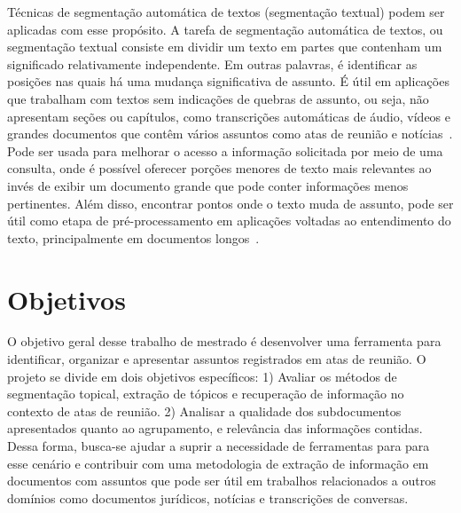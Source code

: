 

Técnicas de segmentação automática de textos (segmentação textual) podem ser aplicadas com esse propósito. A tarefa de segmentação automática de textos, ou segmentação textual consiste em dividir um texto em partes que contenham um significado relativamente independente. Em outras palavras, é identificar as posições nas quais há uma mudança significativa de assunto. É útil em aplicações que trabalham com textos sem indicações de quebras de assunto, ou seja, não apresentam seções ou capítulos, como transcrições automáticas de áudio, vídeos e grandes documentos que contêm vários assuntos como atas de reunião e notícias~\cite{ Bokaei2015, Sakahara2014, Misra2009, Eisenstein2008, Choi2000}.
Pode ser usada para melhorar o acesso a informação solicitada por meio de uma consulta, onde é possível oferecer porções menores de texto mais relevantes ao invés de exibir um documento grande que pode conter informações menos pertinentes.  Além disso, encontrar pontos onde o texto muda de assunto, pode ser útil como etapa de pré-processamento em aplicações voltadas ao entendimento do texto, principalmente em documentos longos~\cite{Choi2000}.





\section{Objetivos}

O objetivo geral desse trabalho de mestrado é desenvolver uma ferramenta para identificar, organizar e apresentar assuntos registrados em atas de reunião. O projeto se divide em dois objetivos específicos: 1) Avaliar os métodos de segmentação topical, extração de tópicos e recuperação de informação no contexto de atas de reunião. 2) Analisar a qualidade dos subdocumentos apresentados quanto ao agrupamento, e relevância das informações contidas.
Dessa forma, busca-se ajudar a suprir a necessidade de ferramentas para para esse cenário e contribuir com uma metodologia de extração de informação em documentos com assuntos que pode ser útil em trabalhos relacionados a outros domínios como documentos jurídicos, notícias e transcrições de conversas.


